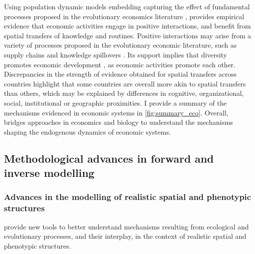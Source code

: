 Using population dynamic models embedding capturing the effect of fundamental processes proposed in the evolutionary economics literature \cite{XXX}, \chapiii provides empirical evidence that economic activities engage in positive interactions, and benefit from spatial transfers of knowledge and routines.
% 
Positive interactions may arise from a variety of processes proposed in the evolutionary economic literature, such as supply chains \cite{Ozman2009,Saavedra2009a} and knowledge spillovers \cite{Menon2015}. 
% 
Its support implies that diversity promotes economic development \cite{Hidalgo2018}, as economic activities promote each other.
% 
Discrepancies in the strength of evidence obtained for spatial transfers across countries highlight that some countries are overall more akin to spatial transfers than others, which may be explained by differences in cognitive, organizational, social, institutional or geographic proximities.
% 
I provide a summary of the mechanisms evidenced in economic systems in \cref{fig:summary_eco}. Overall, \chapiii bridges approaches in economics and biology to understand the mechanisms shaping the endogenous dynamics of economic systems.

% 

% 

\subsection{Methodological advances in forward and inverse modelling}

\subsubsection{Advances in the modelling of realistic spatial and phenotypic structures}

 provide new tools to better understand mechanisms resulting from ecological and evolutionary processes, and their interplay, in the context of realistic spatial and phenotypic structures.

















